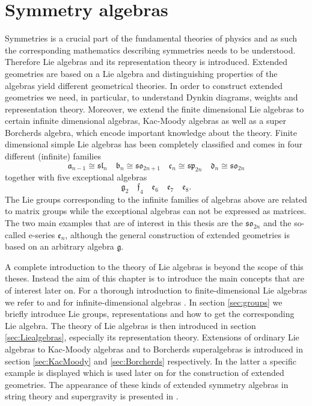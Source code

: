 \chapter{Symmetry algebras}\label{chap:symmetries}
Symmetries is a crucial part of the fundamental theories of physics and as such the corresponding mathematics describing symmetries needs to be understood. Therefore Lie algebras and its representation theory is introduced. Extended geometries are based on a Lie algebra and distinguishing properties of the algebras yield different geometrical theories. In order to construct extended geometries we need, in particular, to understand Dynkin diagrams, weights and representation theory. Moreover, we extend the finite dimensional Lie algebras to certain infinite dimensional algebras, Kac-Moody algebras as well as a super Borcherds algebra, which encode important knowledge about the theory. 
Finite dimensional simple Lie algebras has been completely classified and comes in four different (infinite) families 
\begin{equation*}
    \mathfrak{a}_{n-1} \cong \mathfrak{sl}_{n}\quad \mathfrak{b}_{n}\cong \mathfrak{so}_{2n+1}\quad \mathfrak{c}_{n} \cong \mathfrak{sp}_{2n}\quad \mathfrak{d}_{n}\cong \mathfrak{so}_{2n} 
\end{equation*}
together with five exceptional algebras 
\begin{equation*}
    \mathfrak{g}_2\quad \mathfrak{f}_4 \quad \mathfrak{e_6} \quad \mathfrak{e_7} \quad \mathfrak{e_8}.
\end{equation*}
The Lie groups corresponding to the infinite families of algebras above are related to matrix groups while the exceptional algebras can not be expressed as matrices. The two main examples that are of interest in this thesis are the $\mathfrak{so}_{2n}$ and the so-called e-series $\mathfrak{e}_n$, although the general construction of extended geometries is based on an arbitrary algebra $\mathfrak{g}$. 

A complete introduction to the theory of Lie algebras is beyond the scope of this theses. Instead the aim of this chapter is to introduce the main concepts that are of interest later on. For a thorough introduction to finite-dimensional Lie algebras we refer to \cite{Fuchs1997,FultonHarris2004,Gaberdiel2013} and for infinite-dimensional algebras \cite{Kac1990}. In section \ref{sec:groups} we briefly introduce Lie groups, representations and how to get the corresponding Lie algebra. The theory of Lie algebras is then introduced in section \ref{sec:Liealgebras}, especially its representation theory. Extensions of ordinary Lie algebras to Kac-Moody algebras and to Borcherds superalgebras is introduced in section \ref{sec:KacMoody} and \ref{sec:Borcherds} respectively. In the latter a specific example is displayed which is used later on for the construction of extended geometries. The appearance of these kinds of extended symmetry algebras in string theory and supergravity is presented in \cite{CederwallPalmkvistSuperalgebras2015,Aldazabal2014,Palmkvist2015ExpGeomSuperAlg,deWitTensorHierarchies2008}.



